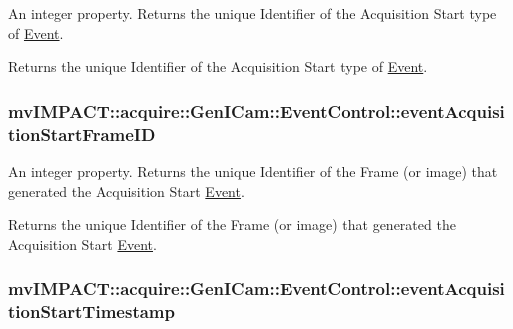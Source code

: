 An integer property. Returns the unique Identifier of the Acquisition Start type of \hyperlink{classmv_i_m_p_a_c_t_1_1acquire_1_1_event}{Event}. 

Returns the unique Identifier of the Acquisition Start type of \hyperlink{classmv_i_m_p_a_c_t_1_1acquire_1_1_event}{Event}. \hypertarget{classmv_i_m_p_a_c_t_1_1acquire_1_1_gen_i_cam_1_1_event_control_a0ab9b11121db973bfbc01216025d3db9}{
\subsubsection[{event\+Acquisition\+Start\+Frame\+I\+D}]{ mv\+I\+M\+P\+A\+C\+T\+::acquire\+::\+Gen\+I\+Cam\+::\+Event\+Control\+::event\+Acquisition\+Start\+Frame\+I\+D}}\label{classmv_i_m_p_a_c_t_1_1acquire_1_1_gen_i_cam_1_1_event_control_a0ab9b11121db973bfbc01216025d3db9}


An integer property. Returns the unique Identifier of the Frame (or image) that generated the Acquisition Start \hyperlink{classmv_i_m_p_a_c_t_1_1acquire_1_1_event}{Event}. 

Returns the unique Identifier of the Frame (or image) that generated the Acquisition Start \hyperlink{classmv_i_m_p_a_c_t_1_1acquire_1_1_event}{Event}. \hypertarget{classmv_i_m_p_a_c_t_1_1acquire_1_1_gen_i_cam_1_1_event_control_a2045f7e08a8bc22b05ff5d4e1f76e627}{
\subsubsection[{event\+Acquisition\+Start\+Timestamp}]{ mv\+I\+M\+P\+A\+C\+T\+::acquire\+::\+Gen\+I\+Cam\+::\+Event\+Control\+::event\+Acquisition\+Start\+Timestamp}}\label{classmv_i_m_p_a_c_t_1_1acquire_1_1_gen_i_cam_1_1_event_control_a2045f7e08a8bc22b05ff5d4e1f76e627}


